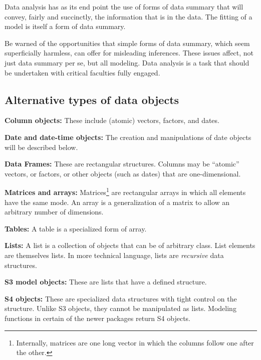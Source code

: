 






Data analysis has as its end point the use of forms of data summary
that will convey, fairly and succinctly, the information that is in
the data.  The fitting of a model is itself a form of data summary.

Be warned of
the opportunities that simple forms of data summary, which seem
superficially harmless, can offer for misleading inferences.  These
issues affect, not just data summary per se, but all modeling.  Data
analysis is a task that should be undertaken with critical
faculties fully engaged.

\subsection*{Alternative types of data objects}

\begin{trivlist}
\item[{\bf Column objects:}] These include (atomic) vectors,
factors, and dates.
\item[{\bf Date and date-time objects:}] The creation and
manipulations of date objects will be described below.
\item[{\bf Data Frames:}] These are rectangular structures.
    Columns may be ``atomic'' vectors, or
  factors, or other objects (such as dates) that are one-dimensional.
\item[{\bf Matrices and arrays:}] Matrices\footnote{Internally,
    matrices are one long vector in which the columns follow one after
    the other.} are rectangular arrays in which all elements have the
  same mode.  An array is a generalization of a matrix to allow
an arbitrary number of dimensions.
\item[{\bf Tables:}]  A table is a specialized form of array.
\item[{\bf Lists:}] A list is a collection of objects that can be of
  arbitrary class. List elements are themselves lists.  In
    more technical language, lists are {\em recursive} data structures.
\item[{\bf S3 model objects:}] These are lists that have a defined
  structure.
\item[{\bf S4 objects:}] These are specialized data structures with
  tight control on the structure. Unlike S3 objects, they cannot be
  manipulated as lists.  Modeling functions in certain of the newer
  packages return S4 objects.
\end{trivlist}

